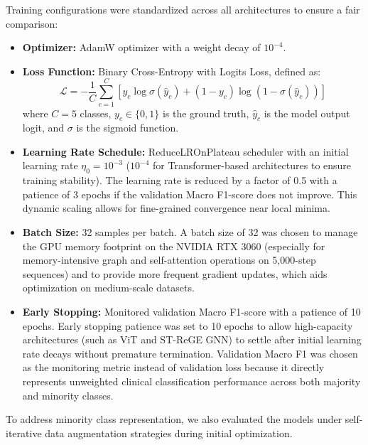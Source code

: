 \documentclass[12pt,a4paper]{report}
\begin{document}
Training configurations were standardized across all architectures to ensure a fair comparison:
\begin{itemize}
    \item \textbf{Optimizer:} AdamW optimizer with a weight decay of $10^{-4}$.
    \item \textbf{Loss Function:} Binary Cross-Entropy with Logits Loss, defined as:
    \begin{equation}
        \mathcal{L} = -\frac{1}{C} \sum_{c=1}^{C} \left[ y_{c} \log \sigma(\hat{y}_{c}) + (1 - y_{c}) \log (1 - \sigma(\hat{y}_{c})) \right]
    \end{equation}
    where $C=5$ classes, $y_{c} \in \{0, 1\}$ is the ground truth, $\hat{y}_{c}$ is the model output logit, and $\sigma$ is the sigmoid function.
    \item \textbf{Learning Rate Schedule:} ReduceLROnPlateau scheduler with an initial learning rate $\eta_{0} = 10^{-3}$ ($10^{-4}$ for Transformer-based architectures to ensure training stability). The learning rate is reduced by a factor of 0.5 with a patience of 3 epochs if the validation Macro F1-score does not improve. This dynamic scaling allows for fine-grained convergence near local minima.
    \item \textbf{Batch Size:} 32 samples per batch. A batch size of 32 was chosen to manage the GPU memory footprint on the NVIDIA RTX 3060 (especially for memory-intensive graph and self-attention operations on 5,000-step sequences) and to provide more frequent gradient updates, which aids optimization on medium-scale datasets.
    \item \textbf{Early Stopping:} Monitored validation Macro F1-score with a patience of 10 epochs. Early stopping patience was set to 10 epochs to allow high-capacity architectures (such as ViT and ST-ReGE GNN) to settle after initial learning rate decays without premature termination. Validation Macro F1 was chosen as the monitoring metric instead of validation loss because it directly represents unweighted clinical classification performance across both majority and minority classes.
\end{itemize}
To address minority class representation, we also evaluated the models under self-iterative data augmentation strategies \cite{jiang2025generation} during initial optimization.
\end{document}
